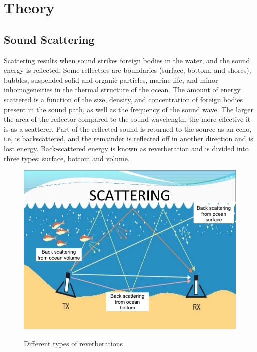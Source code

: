 \chapter*{Theory}



\section{ Sound Scattering } \label{ Sound Scattering }
\noindent Scattering results when sound strikes foreign bodies in the water, and the sound energy is reflected. Some reflectors are boundaries (surface, bottom, and shores), bubbles, suspended solid and organic particles, marine life, and minor inhomogeneities in the thermal structure of the ocean. The amount of energy scattered is a function of the size, density, and concentration of foreign bodies present in the sound path, as well as the frequency of the sound wave. The larger the area of the reflector compared to the sound wavelength, the more effective it is as a scatterer. Part of the reflected sound is returned to the source as an echo, i.e, is backscattered, and the remainder is reflected off in another direction and is lost energy. Back-scattered energy is known as reverberation and is divided into three types: surface, bottom and volume.

\begin{figure}[H]
\centering
{\includegraphics[scale=0.5]{scattering.png}}
\caption{ Different types of reverberations}
\end{figure}

